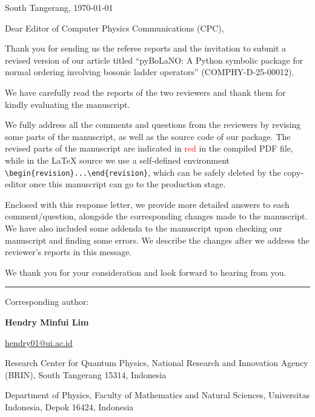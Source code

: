 \documentclass[12pt, a4paper]{article}
\newenvironment{revision}{%
\color{red}
}
{}
\begin{document}
\sloppy


\begin{flushright}
    South Tangerang, \today
\end{flushright}

\bigskip

Dear Editor of Computer Physics Communications (CPC), 

Thank you for sending us the referee reports and the invitation to submit a revised version of our article titled ``pyBoLaNO: A Python symbolic package for normal ordering involving bosonic ladder operators'' (COMPHY-D-25-00012).

We have carefully read the reports of the two reviewers and thank them for kindly evaluating the manuscript.

We fully address all the comments and questions from the reviewers by revising some parts of the manuscript, as well as the source code of our package. The revised parts of the manuscript are indicated in \textcolor{red}{red} in the compiled PDF file, while in the LaTeX source we use a self-defined environment \verb|\begin{revision}...\end{revision}|, which can be safely deleted by the copy-editor once this manuscript can go to the production stage.

Enclosed with this response letter, we provide more detailed answers to each comment/question, alongside the corresponding changes made to the manuscript. We have also included some addenda to the manuscript upon checking our manuscript and finding some errors. We describe the changes after we address the reviewer's reports in this message. 

We thank you for your consideration and look forward to hearing from you.

\bigskip
\hrule
\bigskip

Corresponding author:

\textbf{Hendry Minfui Lim}\

\url{hendry01@ui.ac.id}

{Research Center for Quantum Physics, National Research and Innovation Agency (BRIN), South Tangerang 15314, Indonesia}

{Department of Physics, Faculty of Mathematics and Natural Sciences, Universitas Indonesia, Depok 16424, Indonesia}

\end{document}
